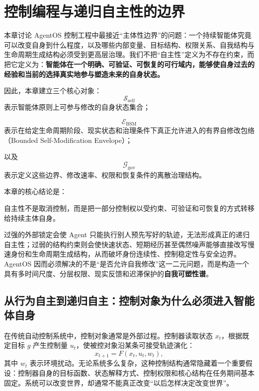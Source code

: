 \chapter{控制编程与递归自主性的边界}
\label{chap:recursive-autonomy-boundary}

\begin{chapterlead}
本章讨论 AgentOS 控制工程中最接近“主体性边界”的问题：一个持续智能体究竟可以改变自身到什么程度，以及哪些内部变量、目标结构、权限关系、自我结构与生命周期生成结构必须受到更高层治理。我们不把“自主性”定义为不存在约束，而把它定义为：\textbf{智能体在一个明确、可验证、可恢复的可行域内，能够使自身过去的经验和当前的选择真实地参与塑造未来的自身状态。}

因此，本章建立三个核心对象：
\[
\boxed{
\mathcal S_{\mathrm{self}}
}
\]
表示智能体原则上可参与修改的自身状态集合；

\[
\boxed{
\mathcal E_{\mathrm{BSM}}
}
\]
表示在给定生命周期阶段、现实状态和治理条件下真正允许进入的有界自修改包络
（Bounded Self-Modification Envelope）；

以及
\[
\boxed{
\mathcal G_{\mathrm{gov}}
}
\]
表示定义这些边界、修改速率、权限和恢复条件的离散治理结构。

本章的核心结论是：
\begin{statementbox}
自主性不是取消控制，而是把一部分控制权以受约束、可验证和可恢复的方式转移给持续主体自身。
\end{statementbox}

过强的外部锁定会使 Agent 只能执行别人预先写好的轨迹，无法形成真正的递归自主性；过弱的结构约束则会使快速状态、短期经历甚至偶然噪声能够直接改写慢速身份和生命周期生成结构，从而破坏身份连续性、控制稳定性与安全边界。AgentOS 因而必须解决的不是“是否允许自我修改”这一二元问题，而是构造一个具有多时间尺度、分层权限、现实反馈和迟滞保护的\textbf{自我可塑性谱}。
\end{chapterlead}


\section{从行为自主到递归自主：控制对象为什么必须进入智能体自身}

在传统自动控制系统中，控制对象通常是外部过程。控制器读取状态 $x_t$，根据既定目标 $g$ 产生控制量 $u_t$，使被控对象沿某条可接受轨迹演化：
\[
x_{t+1}
=
F(x_t,u_t,w_t),
\]
其中 $w_t$ 表示环境扰动。无论系统多么复杂，这种控制结构通常隐藏着一个重要假设：控制器自身的目标函数、状态解释方式、控制权限和核心结构在任务期间基本固定。系统可以改变世界，却通常不能真正改变“以后怎样决定改变世界”。

